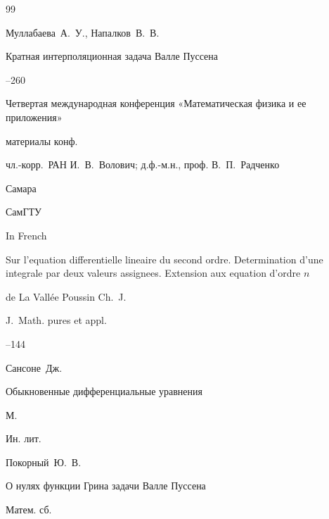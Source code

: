 \begin{thebibliography}{99}




\by Муллабаева~А.~У., Напалков~В.~В. 

\paper Кратная интерполяционная задача Валле Пуссена 

--260

\inbook Четвертая международная конференция «Математическая физика и ее приложения»

\bookinfo материалы конф. 

\eds чл.-корр.~РАН И.~В.~Волович; д.ф.-м.н., проф. В.~П.~Радченко

\publaddr Самара

\publ СамГТУ





\lang In French

\paper Sur l'equation differentielle lineaire du second ordre. Deter\-mi\-na\-tion d’une integrale par deux valeurs assignees. Extension aux equation d'ordre $n$

\by de La Vall\'ee Poussin Ch.~J.

\jour J.~Math. pures et appl.




--144





\by Сансоне~Дж.

\book Обыкновенные дифференциальные уравнения

\publaddr М.

\publ Ин. лит.






\by Покорный~Ю.~В.

\paper О нулях функции Грина задачи Валле Пуссена

\jour Матем. сб.





\end{thebibliography}
